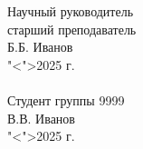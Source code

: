 \begin{titlepage}
\begin{flushright}
\begin{minipage}[t]{0.45\textwidth}
{\hspace*{\fill}Научный руководитель}
\\
\hspace*{\fill}старший преподаватель
\\
\hspace*{\fill}\underline{\hspace{32mm}} Б.Б. Иванов 
\\
\hspace*{\fill}"<\underline{\hspace{7mm}}">\underline{\hspace{35mm}}2025 г.
\\
\hfill \break
\\
\hspace*{\fill}Студент группы 9999
\\
\hspace*{\fill}\underline{\hspace{34mm}} В.В. Иванов
\\
\hspace*{\fill}"<\underline{\hspace{7mm}}">\underline{\hspace{35mm}}2025 г.
\end{minipage}
\end{flushright}
\end{titlepage}
\restoregeometry
\addtocounter{page}{1}
